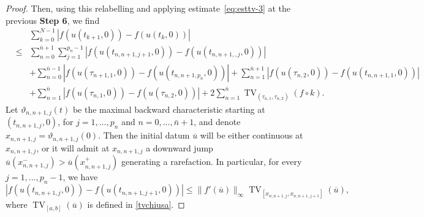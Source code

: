 \documentclass[a4paper, 10pt, final]{article}
\DeclareMathOperator{\tv}{TV}
\begin{document}
\begin{proof}
  Then, using this relabelling and applying estimate~\eqref{eq:esttv-3} at the previous  {\bf Step 6}, we find
  \begin{eqnarray}
  \label{eq:esttv-4}
  && \sum_{k=0}^{N-1} |f(u(t_{k+1},0))-f(u(t_k,0))|
  \\\nonumber  &\leq & \sum_{n=0}^{\bar n+1}\sum_{j=1}^{p_n-1}|f(u(t_{n,n+1,j+1},0))-f(u(t_{n,n+1, ,j},0))| 
      \\ \nonumber 
      && + \sum_{n=0}^{\overline n-1}
      |f(u(\tau_{n+1,1},0))-f(u(t_{n,n+1, p_n},0))|
      + \sum_{n=1}^{\overline n+1}
      |f(u(\tau_{n,2},0))-f(u(t_{n,n+1, 1},0))|\\
      \nonumber && + \sum_{n=1}^{\overline n}
      |f(u(\tau_{n,1},0))-f(u(\tau_{n,2},0))|
      + 2 \sum_{n=1}^{\overline n} 
      \tv_{(\tau_{n,1}, \tau_{n,2})} (f\circ k).
      \end{eqnarray}
  Let  $\vartheta_{n,n+1, j}(t)$
  be the maximal backward characteristic starting at $(t_{n,n+1,j}, 0)$, for $j=1, \dots, p_n$ and  $n=0, \dots, \bar n+1$,   and denote   $x_{n,n+1,j}=\vartheta_{n,n+1,j}(0)$. Then the  initial datum $\overline u$ will be  either   continuous at $x_{n, n+1, j}$, or it will 
  admit at $x_{n,n+1, j}$ a downward jump
  $\overline u(x_{n,n+1,j}^-)>\overline u(x_{n,n+1,j}^+)$ generating a rarefaction.  
In particular, for every $j=1,\dots, p_n-1$, we have 
 \begin{equation}\label{eq:flux-from-indatum-1}  |f(u(t_{n,n+1, j}, 0))-f(u(t_{n,n+1,j+1},0))|\leq \|f'(\overline u)\|_\infty \tv_{[x_{n,n+1,j}, x_{n,n+1,j+1}]}(\overline u),\end{equation} where $\tv_{[a,b]}(\overline u)$ is defined in \eqref{tvchiusa}. 
  

\end{proof}
\end{document}
